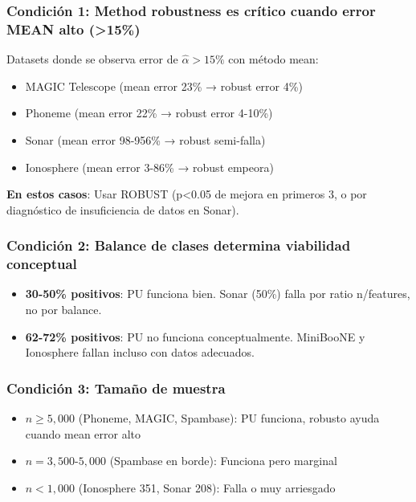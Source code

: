 \documentclass[a4paper,11pt]{article}
\begin{document}
\subsubsection{Condición 1: Method robustness es crítico cuando error MEAN alto (>15\%)}

Datasets donde se observa error de $\hat{\alpha} > 15\%$ con método mean:
\begin{itemize}
    \item MAGIC Telescope (mean error 23\% → robust error 4\%)
    \item Phoneme (mean error 22\% → robust error 4-10\%)
    \item Sonar (mean error 98-956\% → robust semi-falla)
    \item Ionosphere (mean error 3-86\% → robust empeora)
\end{itemize}

\textbf{En estos casos}: Usar ROBUST (p<0.05 de mejora en primeros 3, o por diagnóstico de insuficiencia de datos en Sonar).

\subsubsection{Condición 2: Balance de clases determina viabilidad conceptual}

\begin{itemize}
    \item \textbf{30-50\% positivos}: PU funciona bien. Sonar (50\%) falla por ratio n/features, no por balance.
    \item \textbf{62-72\% positivos}: PU no funciona conceptualmente. MiniBooNE y Ionosphere fallan incluso con datos adecuados.
\end{itemize}

\subsubsection{Condición 3: Tamaño de muestra}

\begin{itemize}
    \item $n \geq 5{,}000$ (Phoneme, MAGIC, Spambase): PU funciona, robusto ayuda cuando mean error alto
    \item $n = 3{,}500$-$5{,}000$ (Spambase en borde): Funciona pero marginal
    \item $n < 1{,}000$ (Ionosphere 351, Sonar 208): Falla o muy arriesgado
\end{itemize}
\end{document}
